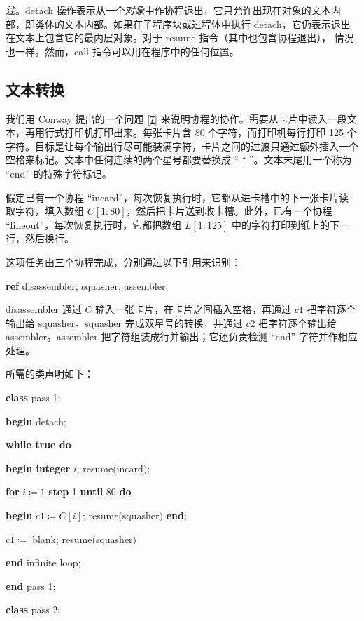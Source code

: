 \textit{注}。detach 操作表示从一个\textit{对象}中作协程退出，它只允许出现在对象的文本内部，即类体的文本内部。如果在子程序块或过程体中执行 detach，它仍表示退出在文本上包含它的最内层对象。对于 resume 指令（其中也包含协程退出），
情况也一样。然而，call 指令可以用在程序中的任何位置。

\subsection{文本转换}

我们用 Conway 提出的一个问题 [\hyperref[ref:7]{7}] 来说明协程的协作。需要从卡片中读入一段文本，再用行式打印机打印出来。每张卡片含 80 个字符，而打印机每行打印 125 个字符。目标是让每个输出行尽可能装满字符，卡片之间的过渡只通过额外插入一个空格来标记。文本中任何连续的两个星号都要替换成 ``$\uparrow$''。文本末尾用一个称为 ``end'' 的特殊字符标记。

假定已有一个协程 ``incard''，每次恢复执行时，它都从进卡槽中的下一张卡片读取字符，填入数组 $C[1 : 80]$，然后把卡片送到收卡槽。此外，已有一个协程 ``lineout''，每次恢复执行时，它都把数组 $L[1 : 125]$ 中的字符打印到纸上的下一行，然后换行。

这项任务由三个协程完成，分别通过以下引用来识别：

\quad \textbf{ref} disassembler, squasher, assembler;

disassembler 通过 $C$ 输入一张卡片，在卡片之间插入空格，再通过 $c1$ 把字符逐个输出给 squasher。squasher 完成双星号的转换，并通过 $c2$ 把字符逐个输出给 assembler。assembler 把字符组装成行并输出；它还负责检测 ``end'' 字符并作相应处理。

所需的类声明如下：

\quad \textbf{class} pass 1;

\quad \textbf{begin} detach;

\quad \quad \textbf{while true do}

\quad \quad \quad \textbf{begin integer} $i$; resume$($incard$)$;

\quad \quad \quad \quad \textbf{for} $i\coloneq 1$ \textbf{step} 1 \textbf{until} 80 \textbf{do}

\quad \quad \quad \quad \quad \textbf{begin} $c1\coloneq C[i]$; resume$($squasher$)$ \textbf{end};

\quad \quad \quad \quad $c1\coloneq$ blank; resume$($squasher$)$

\quad \quad \quad \textbf{end} infinite loop;

\quad \textbf{end} pass 1;

\quad \textbf{class} pass 2;

